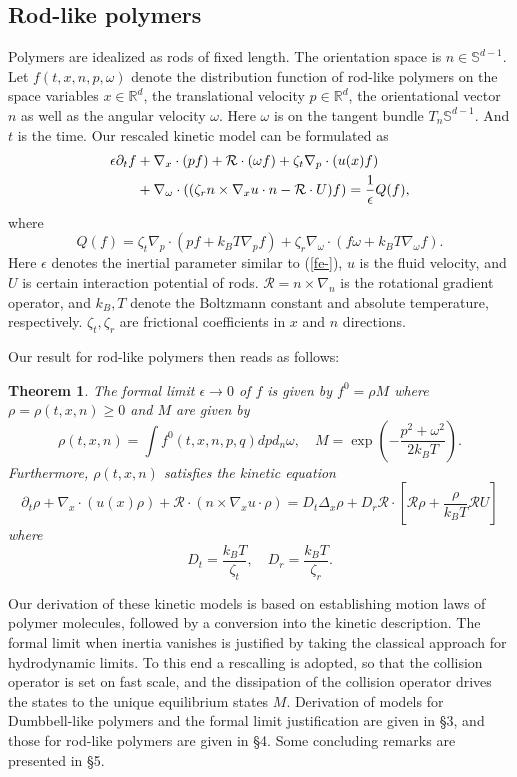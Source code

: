 \documentclass[reqno]{amsart}
\numberwithin{equation}{section}
\newtheorem{Theorem}{Theorem}[section]
\theoremstyle{definition}
\theoremstyle{remark}
\begin{document}
\subsection{Rod-like polymers}
Polymers are idealized as rods of fixed length. The orientation
space is $n \in \mathbb{S}^{d-1}$. Let $f(t, x, n, p, \omega)$
denote the distribution function of rod-like polymers on the space
variables $x\in \mathbb{R}^d$, the translational velocity $p\in
\mathbb{R}^d$, the orientational vector $n$ as well as the angular
velocity $\omega$. Here $\omega$ is on the tangent bundle
$T_n\mathbb{S}^{d-1}$. And $t$ is the time.  Our rescaled kinetic
model can be formulated as
\begin{align} \label{ske-}
\epsilon \partial_t f &+\nabla_x \cdot(pf)+ \mathcal{R}\cdot(\omega
f)+ \zeta_t
\nabla_p \cdot(u(x) f)\notag \\
\quad & + \nabla_\omega \cdot((\zeta_r n\times \nabla_xu \cdot
n-\mathcal{R}\cdot U) f)=\frac{1}{\epsilon}Q(f),
\end{align}
where
$$
Q(f)=\zeta_t \nabla_p\cdot(pf+k_BT \nabla_p f)+\zeta_r \nabla_\omega
\cdot(f\omega +k_BT \nabla_\omega f).
$$
Here $\epsilon$ denotes the inertial parameter similar to
(\ref{fe-}), $u$ is the fluid velocity, and $U$ is certain
interaction potential of rods. $\mathcal{R }=n\times \nabla_n$ is
the rotational gradient operator, and $k_B, T$ denote the Boltzmann
constant and absolute temperature, respectively. $\zeta_t, \zeta_r$
are frictional coefficients in $x$ and $n$ directions.

Our result for rod-like polymers then reads as follows:
\begin{Theorem}The formal limit $\epsilon \to 0$ of $f$ is given by $f^0=\rho M$
where $\rho=\rho(t, x, n) \geq 0$  and $M$ are given by
$$
\rho(t, x, n)=\int f^0(t, x, n, p, q)dpd_n\omega, \quad
M=\exp\left(-\frac{p^2+\omega^2}{2k_BT}\right).
$$
Furthermore, $\rho(t, x, n)$ satisfies the kinetic equation
\begin{equation}\label{fp4-}
  \partial_t \rho +\nabla_x\cdot(u(x)\rho) +\mathcal{R}\cdot(n\times \nabla_xu \cdot \rho)=D_t\Delta_x \rho
  +D_r \mathcal{R}\cdot \left[\mathcal{R}\rho +\frac{\rho}{k_B T}\mathcal{R}U \right]
\end{equation}
where
$$
D_t=\frac{k_BT}{\zeta_t}, \quad D_r=\frac{k_BT}{\zeta_r}.
$$
\end{Theorem}

Our derivation of these kinetic models is based on establishing
motion laws of polymer molecules, followed by a conversion into the
kinetic description. The formal limit when inertia vanishes is
justified by taking the classical approach for hydrodynamic limits.
To this end a rescalling is adopted, so that the collision operator
is set on fast scale, and the dissipation of the collision operator
drives the states to the unique equilibrium states $M$.  Derivation
of models for Dumbbell-like polymers and the formal limit
justification are given in \S 3, and those for rod-like polymers are
given in \S 4. Some concluding remarks are presented in \S 5.
\end{document}
